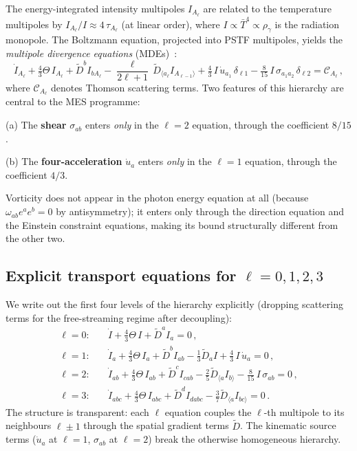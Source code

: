 The energy-integrated intensity multipoles $I_{A_\ell}$ are
related to the temperature multipoles by $I_{A_\ell}/I \approx
4\,\tau_{A_\ell}$ (at linear order), where
$I \propto \bar{T}^4 \propto \rho_\gamma$ is the radiation
monopole.  The Boltzmann equation, projected into PSTF
multipoles, yields the \emph{multipole divergence equations}
(MDEs)~\cite{MaartensGE1999,ChallinorLasenby1999}:
\begin{equation}\label{eq:MDE-general}
\dot{I}_{A_\ell}
+ \tfrac{4}{3}\Theta\,I_{A_\ell}
+ \tilde{D}^b I_{bA_\ell}
- \frac{\ell}{2\ell+1}\,\tilde{D}_{\langle a_\ell}
  I_{A_{\ell-1}\rangle}
+ \tfrac{4}{3}\,I\,\dot{u}_{a_1}\,\delta_{\ell 1}
- \tfrac{8}{15}\,I\,\sigma_{a_1 a_2}\,\delta_{\ell 2}
= \mathcal{C}_{A_\ell}\,,
\end{equation}
where $\mathcal{C}_{A_\ell}$ denotes Thomson scattering terms.
Two features of this hierarchy are central to the MES programme:

(a) The \textbf{shear} $\sigma_{ab}$ enters \emph{only} in the
$\ell = 2$ equation, through the coefficient $8/15$.

(b) The \textbf{four-acceleration} $\dot{u}_a$ enters
\emph{only} in the $\ell = 1$ equation, through the coefficient
$4/3$.

Vorticity does not appear in the photon energy equation at all
(because $\omega_{ab}e^a e^b = 0$ by antisymmetry); it enters
only through the direction equation and the Einstein constraint
equations, making its bound structurally different from the
other two.


\subsection{Explicit transport equations for $\ell = 0, 1, 2, 3$}
\label{sec:transport}

We write out the first four levels of the hierarchy explicitly
(dropping scattering terms for the free-streaming regime after
decoupling):
\begin{align}
\ell = 0:\quad
& \dot{I} + \tfrac{4}{3}\Theta\,I
  + \tilde{D}^a I_a = 0\,,
  \label{eq:ell0}\\[4pt]
\ell = 1:\quad
& \dot{I}_a + \tfrac{4}{3}\Theta\,I_a
  + \tilde{D}^b I_{ab}
  - \tfrac{1}{3}\tilde{D}_a I
  + \tfrac{4}{3}\,I\,\dot{u}_a = 0\,,
  \label{eq:ell1}\\[4pt]
\ell = 2:\quad
& \dot{I}_{ab} + \tfrac{4}{3}\Theta\,I_{ab}
  + \tilde{D}^c I_{cab}
  - \tfrac{2}{5}\tilde{D}_{\langle a} I_{b\rangle}
  - \tfrac{8}{15}\,I\,\sigma_{ab} = 0\,,
  \label{eq:ell2}\\[4pt]
\ell = 3:\quad
& \dot{I}_{abc} + \tfrac{4}{3}\Theta\,I_{abc}
  + \tilde{D}^d I_{dabc}
  - \tfrac{3}{7}\tilde{D}_{\langle a} I_{bc\rangle}
  = 0\,.
  \label{eq:ell3}
\end{align}
The structure is transparent: each $\ell$ equation couples the
$\ell$-th multipole to its neighbours $\ell \pm 1$ through the
spatial gradient terms $\tilde{D}$.  The kinematic source terms
($\dot{u}_a$ at $\ell = 1$, $\sigma_{ab}$ at $\ell = 2$) break
the otherwise homogeneous hierarchy.


